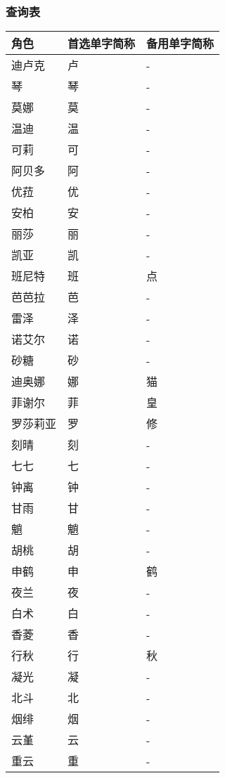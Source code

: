 \subsubsection{查询表}

\begin{longtabu}{|X[2c]|X[c]|X[c]|}
	\hline
	{角色} & {首选单字简称} & {备用单字简称} \\
	\hline
	\endhead
	\hline
	\endfoot
	{迪卢克} & {卢} & {-} \\
	{琴} & {琴} & {-} \\
	{莫娜} & {莫} & {-} \\
	{温迪} & {温} & {-} \\
	{可莉} & {可} & {-} \\
	{阿贝多} & {阿} & {-} \\
	{优菈} & {优} & {-} \\
	\hline
	{安柏} & {安} & {-} \\
	{丽莎} & {丽} & {-} \\
	{凯亚} & {凯} & {-} \\
	{班尼特} & {班} & {点} \\
	{芭芭拉} & {芭} & {-} \\
	{雷泽} & {泽} & {-} \\
	{诺艾尔} & {诺} & {-} \\
	{砂糖} & {砂} & {-} \\
	{迪奥娜} & {娜} & {猫} \\
	{菲谢尔} & {菲} & {皇} \\
	{罗莎莉亚} & {罗} & {修} \\
	\hline
	{刻晴} & {刻} & {-} \\
	{七七} & {七} & {-} \\
	{钟离} & {钟} & {-} \\
	{甘雨} & {甘} & {-} \\
	{魈} & {魈} & {-} \\
	{胡桃} & {胡} & {-} \\
	{申鹤} & {申} & {鹤} \\
	{夜兰} & {夜} & {-} \\
	{白术} & {白} & {-} \\
	{香菱} & {香} & {-} \\
	{行秋} & {行} & {秋} \\
	{凝光} & {凝} & {-} \\
	{北斗} & {北} & {-} \\
	{烟绯} & {烟} & {-} \\
	{云堇} & {云} & {-} \\
	{重云} & {重} & {-} \\

\end{longtabu}
